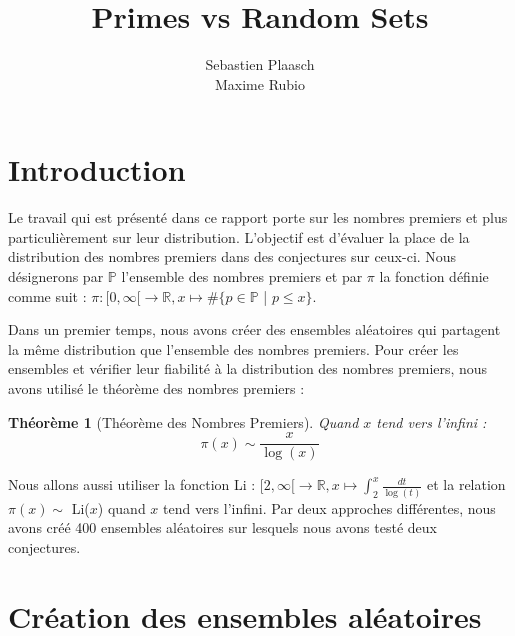 \documentclass{article}
\begin{document}
\author{Sebastien Plaasch \\ Maxime Rubio}
\title{Primes vs Random Sets}
\maketitle
\newpage 
\newpage
\tableofcontents


\newpage

\section{Introduction}
    \label{sec:intro}
\theoremstyle{plain}
\newtheorem{Thm}{Théorème}

Le travail qui est présenté dans ce rapport porte sur les nombres premiers et plus particulièrement sur leur distribution. L'objectif est d'évaluer la place de la distribution des nombres premiers dans des conjectures sur ceux-ci. Nous désignerons par $\mathbb{P}$ l'ensemble des nombres premiers et par $\pi$ la fonction définie comme suit : $\pi : [0, \infty [ \rightarrow \mathbb{R}, x \mapsto \# \{p \in \mathbb{P}$ | $p \leqslant x\}$. 

Dans un premier temps, nous avons créer des ensembles aléatoires qui partagent la même distribution que l'ensemble des nombres premiers. Pour créer les ensembles et vérifier leur fiabilité à la distribution des nombres premiers, nous avons utilisé le théorème des nombres premiers : 
\begin{Thm}[Théorème des Nombres Premiers]
\label{TNP}
	Quand $x$ tend vers l'infini : 
	\[ \pi(x) \sim \frac{x}{\log(x)}  \] 
\end{Thm}
Nous allons aussi utiliser la fonction Li : $ [2, \infty [ \rightarrow \mathbb{R}, x \mapsto \int_{2}^{x} \frac{dt}{\log(t)} $ et la relation $\pi(x) \sim$ Li($x$) quand $x$ tend vers l'infini.  Par deux approches différentes, nous avons créé 400 ensembles aléatoires sur lesquels nous avons testé deux conjectures. 
\clearpage

\section{Création des ensembles aléatoires}
    \label{sec:sec1}
    
    
    
		
\end{document}
